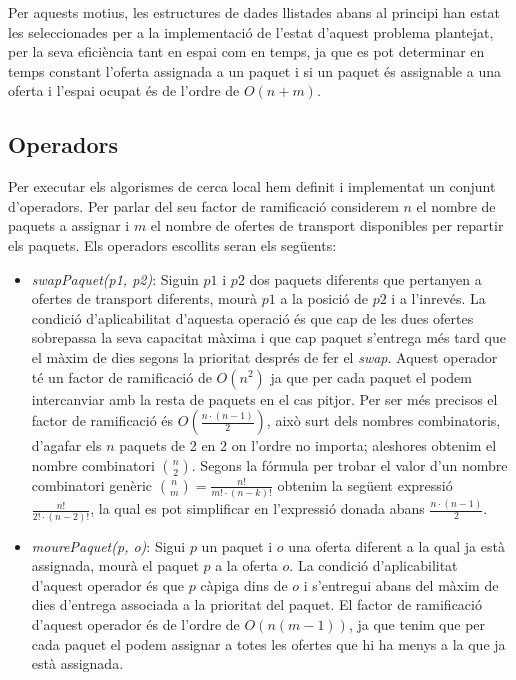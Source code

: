 \documentclass[a4paper]{article}
\begin{document}
	Per aquests motius, les estructures de dades llistades abans al principi han estat les seleccionades per a la implementació de l'estat d'aquest problema plantejat, per la seva eficiència tant en espai com en temps, ja que es pot determinar en temps constant l'oferta assignada a un paquet i si un paquet és assignable a una oferta i l'espai ocupat és de l'ordre de $O(n + m)$. \\
	
	\subsection{Operadors}
	
	Per executar els algorismes de cerca local hem definit i implementat un conjunt d'operadors. Per parlar del seu factor de ramificació considerem $n$ el nombre de paquets a assignar i $m$ el nombre de ofertes de transport disponibles per repartir els paquets. Els operadors escollits seran els següents:
	
	\begin{itemize}
		\item \emph{swapPaquet(p1, p2)}: Siguin $p1$ i $p2$ dos paquets diferents que pertanyen a ofertes de transport diferents, mourà $p1$ a la posició de $p2$ i a l'inrevés. La condició d'aplicabilitat d'aquesta operació és que cap de les dues ofertes sobrepassa la seva capacitat màxima i que cap paquet s'entrega més tard que el màxim de dies segons la prioritat després de fer el \textit{swap}. Aquest operador té un factor de ramificació de $O(n^2)$ ja que per cada paquet el podem intercanviar amb la resta de paquets en el cas pitjor. Per ser més precisos el factor de ramificació és $O(\frac{n·(n-1)}{2})$, això surt dels nombres combinatoris, d'agafar els $n$ paquets de 2 en 2 on l'ordre no importa; aleshores obtenim el nombre combinatori $\binom{n}{2}$. Segons la fórmula per trobar el valor d'un nombre combinatori genèric $\binom{n}{m} = \frac{n!}{m!·(n-k)!}$ obtenim la següent expressió $\frac{n!}{2!·(n-2)!}$, la qual es pot simplificar en l'expressió donada abans $\frac{n·(n-1)}{2}$.
		
		
		\item \emph{mourePaquet(p, o)}: Sigui $p$ un paquet i $o$ una oferta diferent a la qual ja està assignada, mourà el paquet $p$ a la oferta $o$. La condició d'aplicabilitat d'aquest operador és que $p$ càpiga dins de $o$ i s'entregui abans del màxim de dies d'entrega associada a la prioritat del paquet. El factor de ramificació d'aquest operador és de l'ordre de $O(n(m-1))$, ja que tenim que per cada paquet el podem assignar a totes les ofertes que hi ha menys a la que ja està assignada.
	\end{itemize}
	
\end{document}
